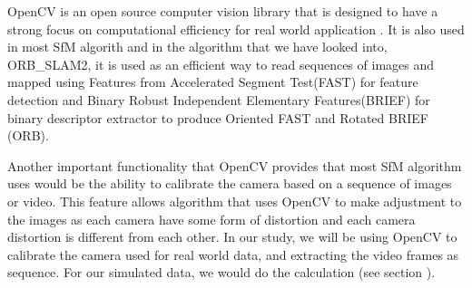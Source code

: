 OpenCV is an open source computer vision library that is designed to have a strong focus on computational efficiency for real world application \cite{bradski2008learning}. It is also used in most SfM algorith and in the algorithm that we have looked into, ORB\_SLAM2, it is used as an efficient way to read sequences of images and mapped using Features from Accelerated Segment Test(FAST) for feature detection and Binary Robust Independent Elementary Features(BRIEF) for binary descriptor extractor to produce Oriented FAST and Rotated BRIEF (ORB)\cite{rublee2011orb,murTRO2015}.

Another important functionality that OpenCV provides that most SfM algorithm uses would be the ability to calibrate the camera based on a sequence of images or video. This feature allows algorithm that uses OpenCV to make adjustment to the images as each camera have some form of distortion and each camera distortion is different from each other. In our study, we will be using OpenCV to calibrate the camera used for real world data, and extracting the video frames as sequence. For our simulated data, we would do the calculation (see section ). 